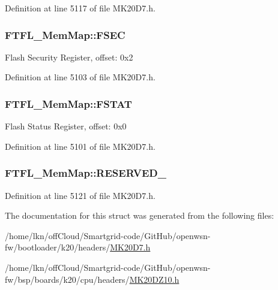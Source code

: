 Definition at line 5117 of file M\+K20\+D7.\+h.

\subsubsection[{\texorpdfstring{F\+S\+EC}{FSEC}}]{ F\+T\+F\+L\+\_\+\+Mem\+Map\+::\+F\+S\+EC}\hypertarget{struct_f_t_f_l___mem_map_a5fc856320bc3d50d05fdf534280c26ac}{}\label{struct_f_t_f_l___mem_map_a5fc856320bc3d50d05fdf534280c26ac}
Flash Security Register, offset\+: 0x2 

Definition at line 5103 of file M\+K20\+D7.\+h.

\subsubsection[{\texorpdfstring{F\+S\+T\+AT}{FSTAT}}]{ F\+T\+F\+L\+\_\+\+Mem\+Map\+::\+F\+S\+T\+AT}\hypertarget{struct_f_t_f_l___mem_map_a7a42be6f802db97dadce683156238a24}{}\label{struct_f_t_f_l___mem_map_a7a42be6f802db97dadce683156238a24}
Flash Status Register, offset\+: 0x0 

Definition at line 5101 of file M\+K20\+D7.\+h.

\subsubsection[{\texorpdfstring{R\+E\+S\+E\+R\+V\+E\+D\+\_\+0}{RESERVED_0}}]{ F\+T\+F\+L\+\_\+\+Mem\+Map\+::\+R\+E\+S\+E\+R\+V\+E\+D\+\_}\hypertarget{struct_f_t_f_l___mem_map_a8c267acaaf04fcdc64a8a924b8409cad}{}\label{struct_f_t_f_l___mem_map_a8c267acaaf04fcdc64a8a924b8409cad}


Definition at line 5121 of file M\+K20\+D7.\+h.



The documentation for this struct was generated from the following files\+:\begin{DoxyCompactItemize}
\item 
/home/lkn/off\+Cloud/\+Smartgrid-\/code/\+Git\+Hub/openwsn-\/fw/bootloader/k20/headers/\hyperlink{bootloader_2k20_2headers_2_m_k20_d7_8h}{M\+K20\+D7.\+h}\item 
/home/lkn/off\+Cloud/\+Smartgrid-\/code/\+Git\+Hub/openwsn-\/fw/bsp/boards/k20/cpu/headers/\hyperlink{_m_k20_d_z10_8h}{M\+K20\+D\+Z10.\+h}\end{DoxyCompactItemize}

